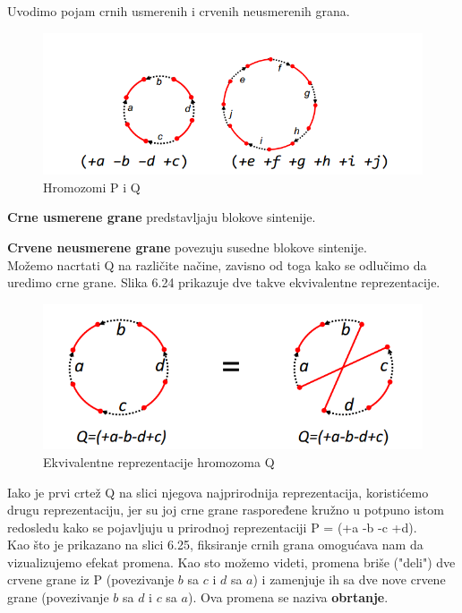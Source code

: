 \noindent Uvodimo pojam crnih usmerenih i crvenih neusmerenih grana.

\begin{figure}[h!]
\centering
\includegraphics[scale=0.6]{poglavlja/6/slike/crne_crvene.PNG}
\caption{Hromozomi P i Q}
\label{slika:X}
\end{figure}

\noindent \textbf{Crne usmerene grane} predstavljaju blokove sintenije.

\noindent \textbf{Crvene neusmerene grane} povezuju susedne blokove sintenije.\\

Možemo nacrtati Q na različite načine, zavisno od toga kako se odlučimo da uredimo crne grane. Slika 6.24 prikazuje dve takve ekvivalentne reprezentacije.\\

\begin{figure}[h!]
\centering
\includegraphics[scale=0.5]{poglavlja/6/slike/ekvivalentne.PNG}
\caption{Ekvivalentne reprezentacije hromozoma Q}
\label{slika:X}
\end{figure}

\newpage
Iako je prvi crtež Q na slici njegova najprirodnija reprezentacija, koristićemo drugu reprezentaciju, jer su joj crne grane raspoređene kružno u potpuno istom redosledu kako se pojavljuju u prirodnoj reprezentaciji P = (+a -b -c +d).\\

Kao što je prikazano na slici 6.25, fiksiranje crnih grana omogućava nam da vizualizujemo efekat promena. Kao sto možemo videti, promena briše ("deli") dve crvene grane iz P (povezivanje $b$ sa $c$ i $d$ sa $a$) i zamenjuje ih sa dve nove crvene grane (povezivanje $b$ sa $d$ i $c$ sa $a$). Ova promena se naziva \textbf{obrtanje}.\\

